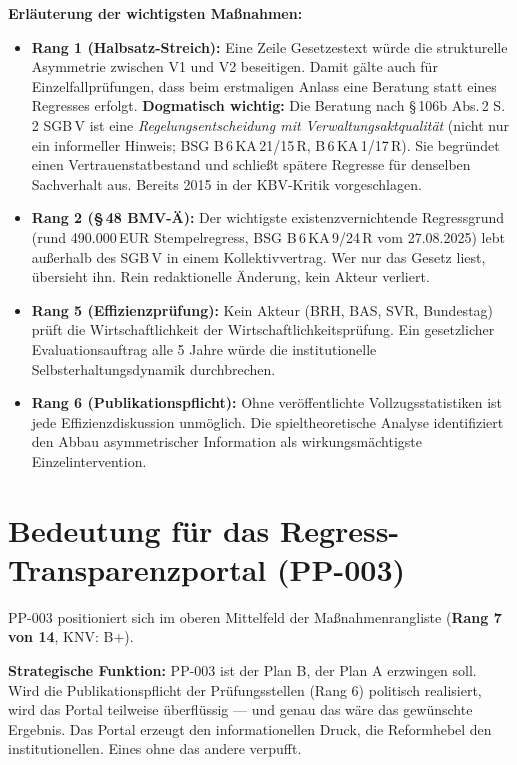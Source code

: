 \documentclass{umbruch-position}
\begin{document}
\textbf{Erl\"auterung der wichtigsten Ma\ss{}nahmen:}

\begin{itemize}
  \item \textbf{Rang 1 (Halbsatz-Streich):} Eine Zeile Gesetzestext w\"urde die strukturelle Asymmetrie zwischen V1 und V2 beseitigen. Damit g\"alte auch f\"ur Einzelfallpr\"ufungen, dass beim erstmaligen Anlass eine Beratung statt eines Regresses erfolgt. \textbf{Dogmatisch wichtig:} Die Beratung nach \S\,106b Abs.\,2 S.\,2 SGB\,V ist eine \textit{Regelungsentscheidung mit Verwaltungsaktqualit\"at} (nicht nur ein informeller Hinweis; BSG B\,6\,KA\,21/15\,R, B\,6\,KA\,1/17\,R). Sie begr\"undet einen Vertrauenstatbestand und schlie\ss{}t sp\"atere Regresse f\"ur denselben Sachverhalt aus. Bereits 2015 in der KBV-Kritik vorgeschlagen.
  \item \textbf{Rang 2 (\S\,48 BMV-\"A):} Der wichtigste existenzvernichtende Regressgrund (rund 490.000\,EUR Stempelregress, BSG B\,6\,KA\,9/24\,R vom 27.08.2025) lebt au\ss{}erhalb des SGB\,V in einem Kollektivvertrag. Wer \glqq{}nur\grqq{} das Gesetz liest, \"ubersieht ihn. Rein redaktionelle \"Anderung, kein Akteur verliert.
  \item \textbf{Rang 5 (Effizienzpr\"ufung):} Kein Akteur (BRH, BAS, SVR, Bundestag) pr\"uft die Wirtschaftlichkeit der Wirtschaftlichkeitspr\"ufung. Ein gesetzlicher Evaluationsauftrag alle 5 Jahre w\"urde die institutionelle Selbsterhaltungsdynamik durchbrechen.
  \item \textbf{Rang 6 (Publikationspflicht):} Ohne ver\"offentlichte Vollzugsstatistiken ist jede Effizienzdiskussion unm\"oglich. Die spieltheoretische Analyse identifiziert den Abbau asymmetrischer Information als wirkungsm\"achtigste Einzelintervention.
\end{itemize}

\section{Bedeutung f\"ur das Regress-Transparenzportal (PP-003)}

PP-003 positioniert sich im oberen Mittelfeld der Ma\ss{}nahmenrangliste (\textbf{Rang 7 von 14}, KNV: B+).

\textbf{Strategische Funktion:} PP-003 ist der \glqq{}Plan B, der Plan A erzwingen soll.\grqq{} Wird die Publikationspflicht der Pr\"ufungsstellen (Rang 6) politisch realisiert, wird das Portal teilweise \"uberfl\"ussig --- und genau das w\"are das gew\"unschte Ergebnis. Das Portal erzeugt den informationellen Druck, die Reformhebel den institutionellen. Eines ohne das andere verpufft.
\end{document}

